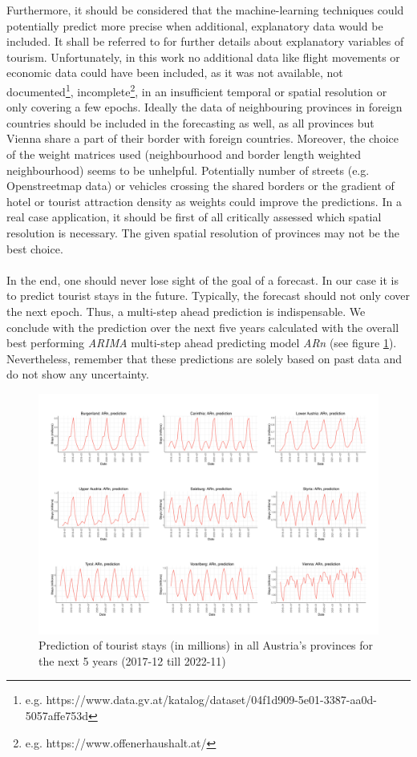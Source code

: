 \documentclass[a4paper,reqno,]{article}
\begin{document}
Furthermore, it should be considered that the machine-learning techniques could potentially predict more precise when additional, explanatory data would be included. It shall be referred to \cite{lim1997review} for further details about explanatory variables of tourism. Unfortunately, in this work no additional data like flight movements or economic data could have been included, as it was not available, not documented\footnote{e.g. https://www.data.gv.at/katalog/dataset/04f1d909-5e01-3387-aa0d-5057affe753d}, incomplete\footnote{e.g. https://www.offenerhaushalt.at/}, in an insufficient temporal or spatial resolution or only covering a few epochs. Ideally the data of neighbouring provinces in foreign countries should be included in the forecasting as well, as all provinces but Vienna share a part of their border with foreign countries. Moreover, the choice of the weight matrices used (neighbourhood and border length weighted neighbourhood) seems to be unhelpful. Potentially number of streets (e.g. Openstreetmap data) or vehicles crossing the shared borders or the gradient of hotel or tourist attraction density as weights could improve the predictions. In a real case application, it should be first of all critically assessed which spatial resolution is necessary. The given spatial resolution of provinces may not be the best choice.
\\
\\
In the end, one should never lose sight of the goal of a forecast. In our case it is to predict tourist stays in the future. Typically, the forecast should not only cover the next epoch. Thus, a multi-step ahead prediction is indispensable. We conclude with the prediction over the next five years calculated with the overall best performing \textit{ARIMA} multi-step ahead predicting model \textit{ARn} (see figure \ref{fig:STARIMA_ARn_predict}). Nevertheless, remember that these predictions are solely based on past data and do not show any uncertainty.
\begin{figure}[h!]
\centering
\includegraphics[width=1\textwidth]{images/ARIMA/STARIMA_ARn_predict.pdf}
\caption{Prediction of tourist stays (in millions) in all Austria's provinces for the next 5 years (2017-12 till 2022-11)}
\label{fig:STARIMA_ARn_predict}
\end{figure}
\end{document}
